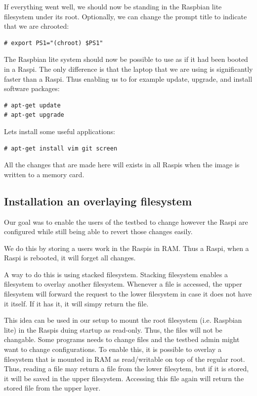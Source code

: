 If everything went well, we should now be standing in the Raspbian lite filesystem
under its root. Optionally, we can change the prompt title to indicate that we
are chrooted:

\begin{lstlisting}[]
# export PS1="(chroot) $PS1"
\end{lstlisting}
\FloatBarrier

The Raspbian lite system should now be possible to use as if it had been booted
in a \ac{Raspi}. The only difference is that the laptop that we are using is
significantly faster than a \ac{Raspi}. Thus enabling us to for example update,
upgrade, and install software packages:

\begin{lstlisting}[]
# apt-get update
# apt-get upgrade
\end{lstlisting}
\FloatBarrier

Lets install some useful applications:
\begin{lstlisting}[]
# apt-get install vim git screen
\end{lstlisting}
\FloatBarrier

All the changes that are made here will exists in all \ac{Raspi}s when the
image is written to a memory card.

\subsection{Installation an overlaying filesystem}

Our goal was to enable the users of the testbed to change however the
\ac{Raspi} are configured while still being able to revert those changes easily.

We do this by storing a users work in the \ac{Raspi}s in \ac{RAM}. Thus a
\ac{Raspi}, when a \ac{Raspi} is rebooted, it will forget all changes.

A way to do this is using stacked filesystem. Stacking filesystem enables
a filesystem to overlay another filesystem. Whenever a file is accessed,
the upper filesystem will forward the request to the lower filesystem in
case it does not have it itself. If it has it, it will simpy return the file.

This idea can be used in our setup to mount the root filesystem (i.e. Raspbian
lite) in the \ac{Raspi}s duing startup as read-only. Thus, the files will not
be changable. Some programs needs to change files and the testbed admin might
want to change configurations. To enable this, it is possible to
overlay a filesystem that is mounted in \ac{RAM} as read/writable on top of
the regular root. Thus, reading a file may return a file from the lower filesytem,
but if it is stored, it will be saved in the upper filesystem. Accessing this file
again will return the stored file from the upper layer.



